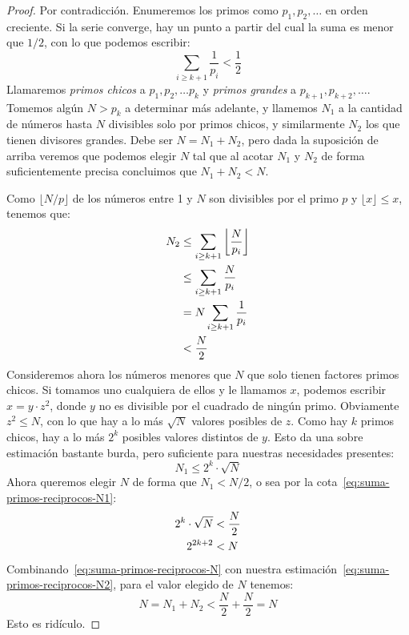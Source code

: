   \begin{proof}
    Por contradicción.%
    Enumeremos los primos como \(p_1, p_2, \dotsc\) en orden creciente.
    Si la serie converge,
    hay un punto a partir del cual la suma es menor que \(1/2\),
    con lo que podemos escribir:
    \begin{equation*}
      \sum_{i \ge k + 1} \frac{1}{p_i} < \frac{1}{2}
    \end{equation*}
    Llamaremos \emph{primos chicos} a \(p_1, p_2, \dotsc p_k\)
    y \emph{primos grandes} a \(p_{k + 1}, p_{k + 2}, \dotsc\).
    Tomemos algún \(N > p_k\) a determinar más adelante,
    y llamemos \(N_1\) a la cantidad de números hasta \(N\)
    divisibles solo por primos chicos,
    y similarmente \(N_2\) los que tienen divisores grandes.
    Debe ser \(N = N_1 + N_2\),
    pero dada la suposición de arriba
    veremos que podemos elegir \(N\)
    tal que al acotar \(N_1\) y \(N_2\) de forma suficientemente precisa
    concluimos que \(N_1 + N_2 < N\).

    Como \(\lfloor N / p \rfloor\) de los números entre 1 y \(N\)
    son divisibles por el primo \(p\)
    y \(\lfloor x \rfloor \le x\),
    tenemos que:
    \begin{align}
      N_2
	&\le \sum_{i \ge k + 1} \left\lfloor \frac{N}{p_i} \right\rfloor
	   \notag \\
	&\le \sum_{i \ge k + 1} \frac{N}{p_i}
	   \notag \\
	&=    N \sum_{i \ge k + 1} \frac{1}{p_i}
	   \notag \\
	&<  \frac{N}{2}
	   \label{eq:suma-primos-reciprocos-N2}
    \end{align}
    Consideremos ahora los números menores que \(N\)
    que solo tienen factores primos chicos.
    Si tomamos uno cualquiera de ellos y le llamamos \(x\),
    podemos escribir \mbox{\(x = y \cdot z^2\)},
    donde \(y\) no es divisible por el cuadrado de ningún primo.
    Obviamente \(z^2 \le N\),
    con lo que hay a lo más \(\sqrt{N}\) valores posibles de \(z\).
    Como hay \(k\) primos chicos,
    hay a lo más \(2^k\) posibles valores distintos de \(y\).
    Esto da una sobre estimación bastante burda,
    pero suficiente para nuestras necesidades presentes:
    \begin{equation}
      \label{eq:suma-primos-reciprocos-N1}
      N_1 \le 2^k \cdot \sqrt{N}
    \end{equation}
    Ahora queremos elegir \(N\) de forma que \(N_1 < N / 2\),
    o sea por la cota~\eqref{eq:suma-primos-reciprocos-N1}:
    \begin{align}
      2^k \cdot \sqrt{N}
	&< \frac{N}{2} \notag \\
      2^{2 k + 2}
	&< N
      \label{eq:suma-primos-reciprocos-N}
    \end{align}
    Combinando~\eqref{eq:suma-primos-reciprocos-N}
    con nuestra estimación~\eqref{eq:suma-primos-reciprocos-N2},
    para el valor elegido de \(N\) tenemos:
    \begin{equation*}
      N
	= N_1 + N_2
	  < \frac{N}{2} + \frac{N}{2}
	    = N
    \end{equation*}
    Esto es ridículo.
  \end{proof}
